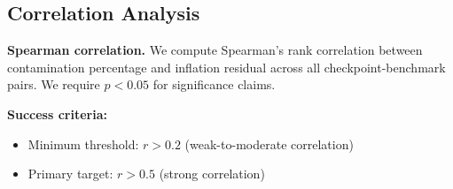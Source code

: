 \subsection{Correlation Analysis}

\textbf{Spearman correlation.} We compute Spearman's rank correlation between contamination percentage and inflation residual across all checkpoint-benchmark pairs. We require $p < 0.05$ for significance claims.

\textbf{Success criteria:}
\begin{itemize}
    \item Minimum threshold: $r > 0.2$ (weak-to-moderate correlation)
    \item Primary target: $r > 0.5$ (strong correlation)
\end{itemize}
